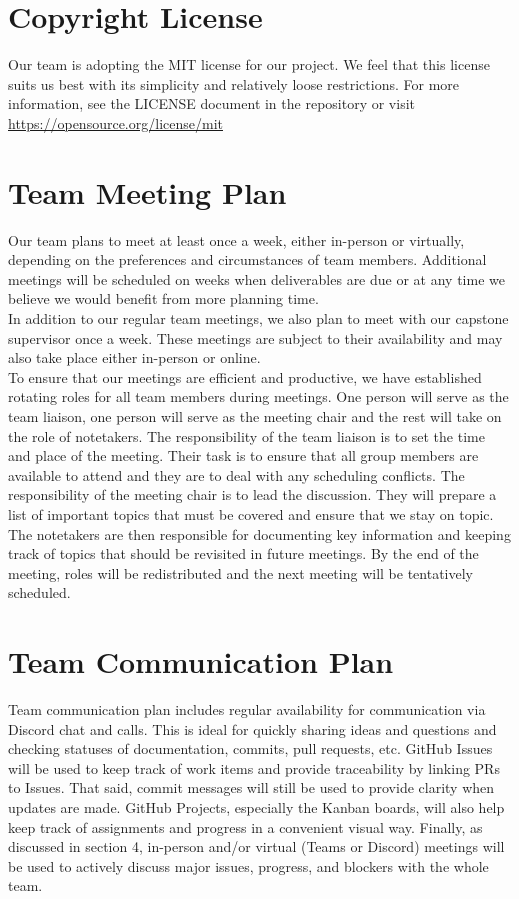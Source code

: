 \documentclass{article}
\begin{document}
\section{Copyright License}

Our team is adopting the MIT license for our project. We feel that this license suits us best with its simplicity and relatively loose restrictions. For more information, see the LICENSE document in the repository or visit \url{https://opensource.org/license/mit}

\section{Team Meeting Plan}

Our team plans to meet at least once a week, either in-person or virtually, depending on the preferences and circumstances of team members. Additional meetings will be scheduled on weeks when deliverables are due or at any time we believe we would benefit from more planning time.\\

In addition to our regular team meetings, we also plan to meet with our capstone supervisor once a week. These meetings are subject to their availability and may also take place either in-person or online.\\

To ensure that our meetings are efficient and productive, we have established rotating roles for all team members during meetings. One person will serve as the team liaison, one person will serve as the meeting chair and the rest will take on the role of notetakers. The responsibility of the team liaison is to set the time and place of the meeting. Their task is to ensure that all group members are available to attend and they are to deal with any scheduling conflicts. The responsibility of the meeting chair is to lead the discussion. They will prepare a list of important topics that must be covered and ensure that we stay on topic. The notetakers are then responsible for documenting key information and keeping track of topics that should be revisited in future meetings. By the end of the meeting, roles will be redistributed and the next meeting will be tentatively scheduled.

\section{Team Communication Plan}

Team communication plan includes regular availability for communication via Discord chat and calls. This is ideal for quickly sharing ideas and questions and checking statuses of documentation, commits, pull requests, etc. GitHub Issues will be used to keep track of work items and provide traceability by linking PRs to Issues. That said, commit messages will still be used to provide clarity when updates are made. GitHub Projects, especially the Kanban boards, will also help keep track of assignments and progress in a convenient visual way. Finally, as discussed in section 4, in-person and/or virtual (Teams or Discord) meetings will be used to actively discuss major issues, progress, and blockers with the whole team.
\end{document}
